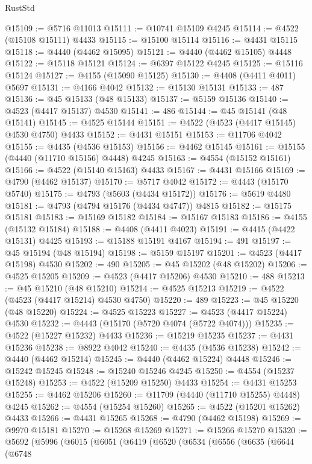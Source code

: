 \begin{lexlean}{RustStd}
\begin{coremodule}
@15109 := @5716 @11013
@15111 := @10741 @15109 @4245
@15114 := @4522 (@15108 @15111) @4433
@15115 := @15100 @15114
@15116 := @4431 @15115
@15118 := @4440 (@4462 @15095)
@15121 := @4440 (@4462 @15105) @4448
@15122 := @15118 @15121
@15124 := @6397 @15122 @4245
@15125 := @15116 @15124
@15127 := @4155 (@15090 @15125)
@15130 := @4408 (@4411 @4011) @5697
@15131 := @4166 @4042
@15132 := @15130 @15131
@15133 := 487
@15136 := @45 @15133 (@48 @15133)
@15137 := @5159 @15136
@15140 := @4523 (@4417 @15137) @4530
@15141 := 486
@15144 := @45 @15141 (@48 @15141)
@15145 := @4525 @15144
@15151 := @4522 (@4523 (@4417 @15145) @4530 @4750) @4433
@15152 := @4431 @15151
@15153 := @11706 @4042
@15155 := @4435 (@4536 @15153)
@15156 := @4462 @15145
@15161 := @15155 (@4440 (@11710 @15156) @4448) @4245
@15163 := @4554 (@15152 @15161)
@15166 := @4522 (@15140 @15163) @4433
@15167 := @4431 @15166
@15169 := @4790 (@4462 @15137)
@15170 := @5717 @4042
@15172 := @4443 (@15170 @5740)
@15175 := @4793 (@5603 (@4434 @15172))
@15176 := @5619 @4480
@15181 := @4793 (@4794 @15176 (@4434 @4747)) @4815
@15182 := @15175 @15181
@15183 := @15169 @15182
@15184 := @15167 @15183
@15186 := @4155 (@15132 @15184)
@15188 := @4408 (@4411 @4023)
@15191 := @4415 (@4422 @15131) @4425
@15193 := @15188 @15191 @4167
@15194 := 491
@15197 := @45 @15194 (@48 @15194)
@15198 := @5159 @15197
@15201 := @4523 (@4417 @15198) @4530
@15202 := 490
@15205 := @45 @15202 (@48 @15202)
@15206 := @4525 @15205
@15209 := @4523 (@4417 @15206) @4530
@15210 := 488
@15213 := @45 @15210 (@48 @15210)
@15214 := @4525 @15213
@15219 := @4522 (@4523 (@4417 @15214) @4530 @4750)
@15220 := 489
@15223 := @45 @15220 (@48 @15220)
@15224 := @4525 @15223
@15227 := @4523 (@4417 @15224) @4530
@15232 := @4443 (@15170 (@5720 @4074 (@5722 @4074)))
@15235 := @4522 (@15227 @15232) @4433
@15236 := @15219 @15235
@15237 := @4431 @15236
@15238 := @8922 @4042
@15240 := @4435 (@4536 @15238)
@15242 := @4440 (@4462 @15214)
@15245 := @4440 (@4462 @15224) @4448
@15246 := @15242 @15245
@15248 := @15240 @15246 @4245
@15250 := @4554 (@15237 @15248)
@15253 := @4522 (@15209 @15250) @4433
@15254 := @4431 @15253
@15255 := @4462 @15206
@15260 := @11709 (@4440 (@11710 @15255) @4448) @4245
@15262 := @4554 (@15254 @15260)
@15265 := @4522 (@15201 @15262) @4433
@15266 := @4431 @15265
@15268 := @4790 (@4462 @15198)
@15269 := @9970 @15181
@15270 := @15268 @15269
@15271 := @15266 @15270
@15320 := @5692
    (@5996
      (@6015
        (@6051
          (@6419
            (@6520
              (@6534
                (@6556
                  (@6635
                    (@6644
                      (@6748

\end{coremodule}
\end{lexlean}

